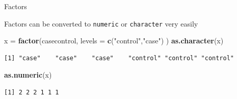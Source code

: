 \documentclass[
  ignorenonframetext,
]{beamer}
\newenvironment{Shaded}{\begin{snugshade}}{\end{snugshade}}
\newcommand{\DataTypeTok}[1]{\textcolor[rgb]{0.13,0.29,0.53}{#1}}
\newcommand{\KeywordTok}[1]{\textcolor[rgb]{0.13,0.29,0.53}{\textbf{#1}}}
\newcommand{\NormalTok}[1]{#1}
\newcommand{\StringTok}[1]{\textcolor[rgb]{0.31,0.60,0.02}{#1}}
\begin{document}
\begin{frame}[fragile]{Factors}
\protect\hypertarget{factors-4}{}

Factors can be converted to \texttt{numeric} or \texttt{character} very
easily

\begin{Shaded}
\begin{Highlighting}[]
\NormalTok{x =}\StringTok{ }\KeywordTok{factor}\NormalTok{(casecontrol,}
        \DataTypeTok{levels =} \KeywordTok{c}\NormalTok{(}\StringTok{"control"}\NormalTok{,}\StringTok{"case"}\NormalTok{) )}
\KeywordTok{as.character}\NormalTok{(x)}
\end{Highlighting}
\end{Shaded}

\begin{verbatim}
[1] "case"    "case"    "case"    "control" "control" "control"
\end{verbatim}

\begin{Shaded}
\begin{Highlighting}[]
\KeywordTok{as.numeric}\NormalTok{(x)}
\end{Highlighting}
\end{Shaded}

\begin{verbatim}
[1] 2 2 2 1 1 1
\end{verbatim}

\end{frame}
\end{document}
